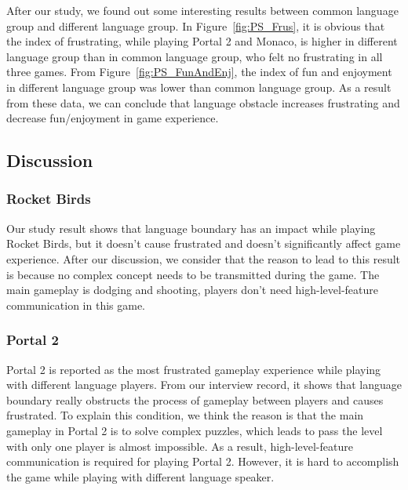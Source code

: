 After our study, we found out some interesting results between common language group and different language group. In Figure~\ref{fig:PS_Frus}, it is obvious that the index of frustrating, while playing Portal 2 and Monaco, is higher in different language group than in common language group, who felt no frustrating in all three games. From Figure~\ref{fig:PS_FunAndEnj}, the index of fun and enjoyment in different language group was lower than common language group. As a result from these data, we can conclude that language obstacle increases frustrating and decrease fun/enjoyment in game experience.


\subsection{Discussion}
\subsubsection{Rocket Birds}

Our study result shows that language boundary has an impact while playing Rocket Birds, but it doesn't cause frustrated and doesn't significantly affect game experience. After our discussion, we consider that the reason to lead to this result is because no complex concept needs to be transmitted during the game. The main gameplay is dodging and shooting, players don't need high-level-feature communication in this game.


\subsubsection{Portal 2}

Portal 2 is reported as the most frustrated gameplay experience while playing with different language players. From our interview record, it shows that language boundary really obstructs the process of gameplay between players and causes frustrated. To explain this condition, we think the reason is that the main gameplay in Portal 2 is to solve complex puzzles, which leads to pass the level with only one player is almost impossible. As a result, high-level-feature communication is required for playing Portal 2. However, it is hard to accomplish the game while playing with different language speaker.


